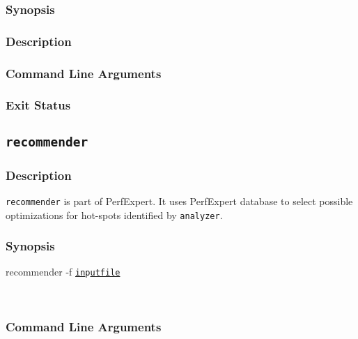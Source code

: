 \subsubsection{Synopsis}

\subsubsection{Description}

\subsubsection{Command Line Arguments}

\subsubsection{Exit Status}

\subsection{\texttt{recommender}}

\subsubsection{Description}

\texttt{recommender} is part of PerfExpert. It uses PerfExpert database to select possible optimizations for hot-spots identified by \texttt{analyzer}.

     
\subsubsection{Synopsis}

\btt recommender -f \tt\underline{in}p\underline{utfile} \par
\ \ \ \ \ \ \ \ \ \normalfont

\subsubsection{Command Line Arguments}

